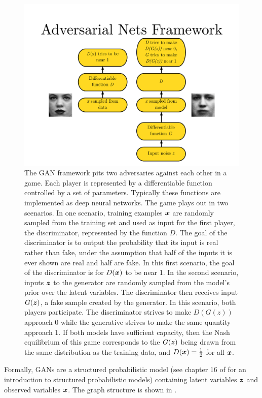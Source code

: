 \begin{figure}
\includegraphics[width=\textwidth]{framework}
\caption{The GAN framework pits two adversaries against each other in a game.
Each player is represented by a differentiable function controlled by a set
of parameters.
Typically these functions are implemented as deep neural networks.
The game plays out in two scenarios.
In one scenario, training examples ${\bm{x}}$ are randomly sampled from the training
set and used as input for the first player, the discriminator, represented
by the function $D$. The goal of the discriminator is to output the probability
that its input is real rather than fake, under the assumption that half of the
inputs it is ever shown are real and half are fake.
In this first scenario, the goal of the discriminator is for $D({\bm{x}})$ to be
near 1.
In the second scenario, inputs ${\bm{z}}$ to the generator are randomly sampled from
the model's prior over the latent variables.
The discriminator then receives input $G({\bm{z}})$, a fake sample created by the
generator.
In this scenario, both players participate. The discriminator strives to make
$D(G(z))$ approach 0 while the generative strives to make the same quantity
approach 1.
If both models have sufficient capacity, then the Nash equilibrium of this game
corresponds to the $G({\bm{z}})$ being drawn from the same distribution as the training
data, and $D({\bm{x}}) = \frac{1}{2}$ for all ${\bm{x}}$.
}
\label{fig:framework}
\end{figure}

Formally, GANs are a structured probabilistic model (see chapter 16 of
\citet{Goodfellow-et-al-2016} for an introduction to structured probabilistic
models) containing latent variables ${\bm{z}}$ and observed variables ${\bm{x}}$.
The graph structure is shown in .

